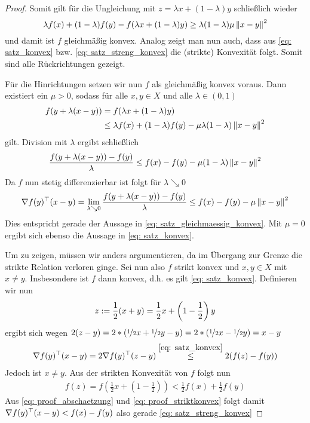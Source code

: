 \begin{proof}
	Somit gilt für die Ungleichung mit $z = \lambda x + (1-\lambda) y$ schließlich wieder
	\begin{equation*}
		\lambda f(x) + (1-\lambda) f(y) - f(\lambda x + (1-\lambda) y) \geq \lambda (1-\lambda) \mu \left\lVert x-y \right\rVert^2
	\end{equation*}
	und damit ist $f$ gleichmäßig konvex. Analog zeigt man nun auch, dass aus \eqref{eq: satz_konvex} bzw. \eqref{eq: satz_streng_konvex} die (strikte) Konvexität folgt. Somit sind alle Rückrichtungen gezeigt.
	
	Für die Hinrichtungen setzen wir nun $f$ als gleichmäßig konvex voraus. Dann existiert ein $\mu > 0$, sodass für alle $x,y \in X$ und alle $\lambda \in (0,1)$
	\begin{equation*}
	\begin{aligned}
		f(y + \lambda(x-y)) 
		&= f(\lambda x + (1-\lambda) y) \\
		&\leq \lambda f(x) + (1-\lambda) f(y) - \mu \lambda (1-\lambda) \left\lVert x-y \right\rVert^2
	\end{aligned}
	\end{equation*}
	gilt. Division mit $\lambda$ ergibt schließlich
	\begin{align*}
		\frac{f(y + \lambda (x-y)) - f(y)}{\lambda} \leq f(x) - f(y) - \mu (1-\lambda) \left\lVert x-y \right\rVert^2
	\end{align*}
	Da $f$ nun stetig differenzierbar ist folgt für $\lambda \searrow 0$
	\begin{align} \label{eq: proof_differenzieren}
		\nabla f(y)^{\top} (x-y) = \lim_{\lambda \searrow 0} \frac{f(y + \lambda (x-y)) - f(y)}{\lambda} \leq f(x) - f(y) - \mu \left\lVert x-y \right\rVert^2
	\end{align}
	Dies entspricht gerade der Aussage in \eqref{eq: satz_gleichmaessig_konvex}. Mit $\mu = 0$ ergibt sich ebenso die Aussage in \eqref{eq: satz_konvex}.
	
	Um  zu zeigen, müssen wir anders argumentieren, da im Übergang zur Grenze die strikte Relation verloren ginge. Sei nun also $f$ strikt konvex und $x,y \in X$ mit $x \neq y$. Insbesondere ist $f$ dann konvex, d.h. es gilt \eqref{eq: satz_konvex}. Definieren wir nun
	\begin{equation*}
		z \mathrel{:=} \frac{1}{2}(x+y) = \frac{1}{2} x + \left(1 - \frac{1}{2}\right) y 
	\end{equation*}
	ergibt sich wegen $2(z-y) = 2 * \left( \lfrac{1}{2}x + \lfrac{1}{2}y - y \right) = 2 * \left( \lfrac{1}{2}x - \lfrac{1}{2}y  \right) = x -y$
	\begin{align} \label{eq: proof_abschaetzung}
		\nabla f(y)^{\top} (x-y) = 2 \nabla f(y)^{\top} (z-y) \overset{\eqref{eq: satz_konvex}}{\leq} 2( f(z) - f(y))
	\end{align}
	Jedoch ist $x \neq y$. Aus der strikten Konvexität von $f$ folgt nun
	\begin{align} \label{eq: proof_striktkonvex}
		f(z) = f \left( \frac{1}{2} x + \left( 1 - \frac{1}{2} \right) \right) < \frac{1}{2} f(x) + \frac{1}{2} f(y)
	\end{align}
	Aus \eqref{eq: proof_abschaetzung} und \eqref{eq: proof_striktkonvex} folgt damit $\nabla f(y)^{\top} (x-y) < f(x) - f(y)$ also gerade \eqref{eq: satz_streng_konvex}
\end{proof}

